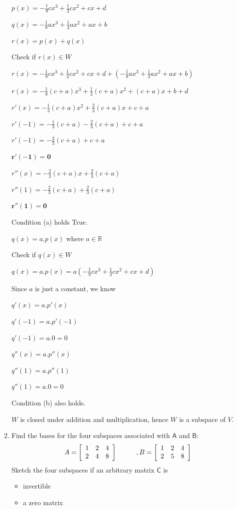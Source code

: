 \documentclass[a4paper, 11pt]{article}
\newcommand{\mat}[1]{\boldsymbol { \mathsf{#1}} }
\begin{document}
\begin{enumerate}
\begin{center}
	$p(x) = -\frac{1}{9}cx^3 + \frac{1}{3}cx^2 + cx + d$

	$q(x) = -\frac{1}{9}ax^3 + \frac{1}{3}ax^2 + ax + b$

	$r(x) = p(x) + q(x)$

	Check if $r(x) \in W$ 

	$r(x) = -\frac{1}{9}cx^3 + \frac{1}{3}cx^2 + cx + d + (-\frac{1}{9}ax^3 + \frac{1}{3}ax^2 + ax + b)$

	$r(x) = -\frac{1}{9}(c+a)x^3 + \frac{1}{3}(c+a)x^2 + (c + a)x + b + d$

	$r'(x) = -\frac{1}{3}(c+a)x^2 + \frac{2}{3}(c+a)x + c + a$
	
	$r'(-1) = -\frac{1}{3}(c + a) - \frac{2}{3}(c+a) + c + a$
	
	$r'(-1) = -\frac{3}{3}(c + a) + c + a$
	
	$\mathbf{r'(-1) = 0}$
	
	$r''(x) = -\frac{2}{3}(c + a)x + \frac{2}{3}(c+a)$
	
	$r''(1) = -\frac{2}{3}(c+a) + \frac{2}{3}(c+a)$
	
	$\mathbf{r''(1) = 0}$
	
	Condition (a) holds True.
	
	$q(x) = a.p(x)$ where $a \in \mathbb{R}$
	
	Check if $q(x) \in W$
	
	$q(x) = a.p(x) = a(-\frac{1}{9}cx^3 + \frac{1}{3}cx^2 + cx + d)$
	
	Since $a$ is just a constant, we know 
	
	$q'(x) = a.p'(x)$ 
	
	$q'(-1) = a.p'(-1)$
	
	$q'(-1) = a.0 = 0$
	
	$q''(x) = a.p''(x)$
	
	$q''(1) = a.p''(1)$
	
	$q''(1) = a.0 = 0$
	
	Condition (b) also holds.
	
	$W$ is closed under addition and multiplication, hence $W$ is a subspace of $V$.
\end{center}


\item Find the bases for the four subspaces associated with $\mat A$ and $\mat B$:
\[ A = \left[ \begin{array}{ccc}
1&2&4\\
2&4&8
\end{array} \right]
\hspace{10mm}, B = \left[ \begin{array}{ccc}
1&2&4\\
2&5&8
\end{array} \right]\]
Sketch the four subspaces if an arbitrary matrix $\mat C$ is \begin{itemize}
  \item invertible
  \item a zero matrix
\end{itemize}


\end{enumerate}
\end{document}

